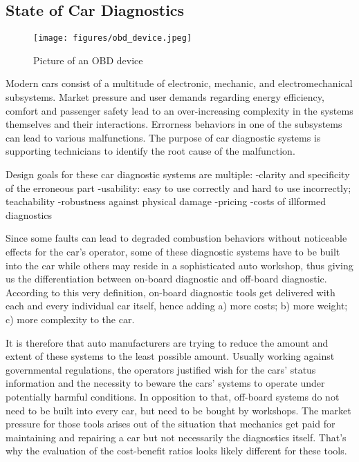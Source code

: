 \subsection{State of Car Diagnostics}
\begin{figure}[ht]
  \centering
  \texttt{[image: figures/obd\_device.jpeg]}
  \caption{Picture of an OBD device}
  \label{fig:obd}
\end{figure}
Modern cars consist of a multitude of electronic, mechanic, and electromechanical subsystems. 
Market pressure and user demands regarding energy efficiency, comfort and passenger safety lead to an over-increasing complexity in the systems themselves and their interactions. 
Errorness behaviors in one of the subsystems can lead to various malfunctions. 
The purpose of car diagnostic systems is supporting technicians to identify the root cause of the malfunction.

Design goals for these car diagnostic systems are multiple:
-clarity and specificity of the erroneous part
-usability: easy to use correctly and hard to use incorrectly; teachability
-robustness against physical damage
-pricing
-costs of illformed diagnostics

Since some faults can lead to degraded combustion behaviors without noticeable effects for the car’s operator, some of these diagnostic systems have to be built into the car while others may reside in a sophisticated auto workshop, thus giving us the differentiation between on-board diagnostic and off-board diagnostic. 
According to this very definition, on-board diagnostic tools get delivered with each and every individual car itself, hence adding a) more costs; b) more weight; c) more complexity to the car.

It is therefore that auto manufacturers are trying to reduce the amount and extent of these systems to the least possible amount. 
Usually working against governmental regulations, the operators justified wish for the cars’ status information and the necessity to beware the cars’ systems to operate under potentially harmful conditions. 
In opposition to that, off-board systems do not need to be built into every car, but need to be bought by workshops. 
The market pressure for those tools arises out of the situation that mechanics get paid for maintaining and repairing a car but not necessarily the diagnostics itself. 
That’s why the evaluation of the cost-benefit ratios looks likely different for these tools.

